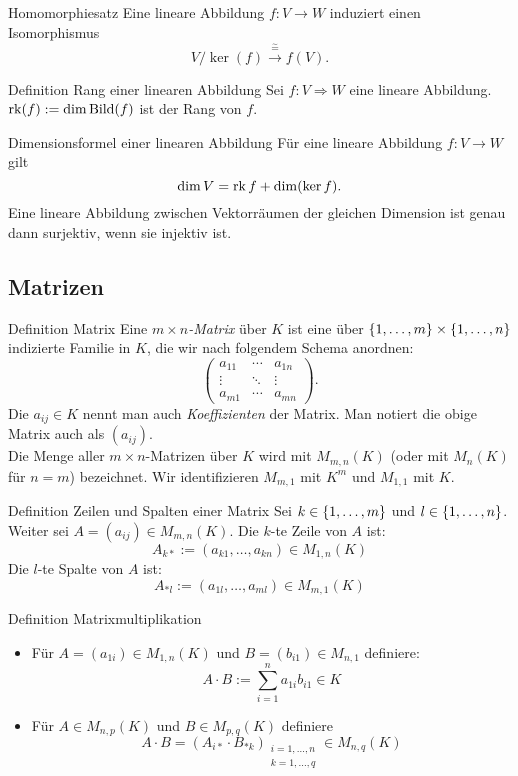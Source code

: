 \documentclass[main.tex]{subfiles}
\begin{document}
\begin{karte}{Homomorphiesatz}
    Eine lineare Abbildung \(f: V \rightarrow W\) 
    induziert einen Isomorphismus
    \[ V/\ker(f) \xrightarrow{\overset{\sim}{=}} f(V). \]
\end{karte}
\begin{karte}{Definition Rang einer linearen Abbildung}
    Sei \(f : V \Rightarrow W\) eine lineare Abbildung. 
    \(\operatorname{rk}(f) := \dim \operatorname{Bild}(f) \) ist der Rang von \(f\).
\end{karte}
\begin{karte}{Dimensionsformel einer linearen Abbildung}
    Für eine lineare Abbildung \( f: V \rightarrow W \) 
    gilt 
    \[ \dim V = \operatorname{rk} f + \dim(\ker f). \]
    Eine lineare Abbildung zwischen Vektorräumen 
    der gleichen Dimension ist genau dann surjektiv, wenn sie 
    injektiv ist.    
\end{karte}
\subsection*{Matrizen}
\begin{karte}{Definition Matrix}
    Eine \textit{\(m \times n\)-Matrix} über \(K\) ist 
    eine über \( \{1,\ldots,m\} \times \{1,\ldots,n\} \) 
    indizierte Familie in \(K\), die wir nach folgendem Schema 
    anordnen:
    \[ \begin{pmatrix}
        a_{11} & \cdots & a_{1n}\\
        \vdots & \ddots & \vdots \\
        a_{m1} & \cdots & a_{mn}
    \end{pmatrix}. \]
    Die \( a_{ij} \in K \) nennt man auch 
    \textit{Koeffizienten} der Matrix. Man notiert die obige 
    Matrix auch als \( (a_{ij}) \). \\
    Die Menge aller \( m \times n \)-Matrizen über \(K\) wird 
    mit \( M_{m,n}(K) \) (oder mit \(M_n(K)\) für \(n=m\)) 
    bezeichnet. Wir identifizieren \( M_{m,1} \) mit \(K^m\) 
    und \( M_{1,1} \) mit \(K\).
\end{karte}
\begin{karte}{Definition Zeilen und Spalten einer Matrix}
    Sei \(k \in \{1, \ldots, m\}\) und \(l \in \{1, \ldots , n\}\).
    Weiter sei \(A = (a_{ij}) \in M_{m,n}(K)\). 
    Die \(k\)-te Zeile von \(A\) ist: 
    \[A_{k*} := (a_{k1},  \ldots, a_{kn}) \in M_{1,n}(K)\]
    Die \(l\)-te Spalte von \(A\) ist:
    \[A_{*l} := (a_{1l}, \ldots , a_{ml}) \in M_{m,1}(K)\]                        
\end{karte}
\begin{karte}{Definition Matrixmultiplikation}
    \begin{itemize}
        \item Für \(A = (a_{1i}) \in M_{1,n}(K)\) und 
        \(B = (b_{i1}) \in M_{n,1}\) definiere: 
        \[A \cdot B := \sum_{i=1}^n a_{1i}b_{i1} \in K\]
        \item Für \(A \in M_{n,p}(K)\) und \(B \in M_{p,q}(K)\) definiere
        \[A \cdot B = {(A_{i*} \cdot B_{*k})}_{\substack{i=1,\ldots,n \\ k=1,\ldots,q}} 
        \in M_{n,q}(K) \]
    \end{itemize}
\end{karte}
\end{document}
